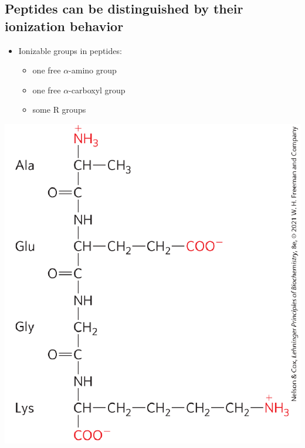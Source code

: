 \documentclass[10pt]{article}
\begin{document}
\subsection*{Peptides can be distinguished by their ionization behavior}
\begin{itemize}
    \item Ionizable groups in peptides:
    \begin{itemize}
        \item one free $\alpha$-amino group
        \item one free $\alpha$-carboxyl group
        \item some R groups
    \end{itemize}
\end{itemize}
\begin{center}
    \includegraphics[scale=0.7]{L2_11.png}
\end{center}
\end{document}
